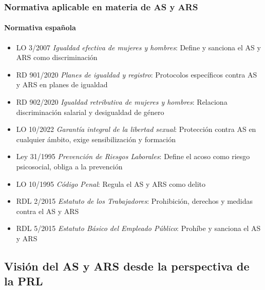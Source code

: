 \documentclass{beamer}
\newcommand{\highlight}[1]{{\color{Blue} #1}}
\begin{document}
    \begin{frame}
        \frametitle{Normativa aplicable en materia de AS y ARS}
        \framesubtitle{Normativa española}
        \begin{itemize}
            \item \highlight{LO 3/2007} \textit{Igualdad efectiva de mujeres y hombres}: Define y sanciona el AS y ARS como discriminación
            \item \highlight{RD 901/2020} \textit{Planes de igualdad y registro}: Protocolos específicos contra AS y ARS en planes de igualdad
            \item \highlight{RD 902/2020} \textit{Igualdad retributiva de mujeres y hombres}: Relaciona discriminación salarial y desigualdad de género
            \item \highlight{LO 10/2022} \textit{Garantía integral de la libertad sexual}: Protección contra AS en cualquier ámbito, exige sensibilización y formación
            \item \highlight{Ley 31/1995} \textit{Prevención de Riesgos Laborales}: Define el acoso como riesgo psicosocial, obliga a la prevención
            \item \highlight{LO 10/1995} \textit{Código Penal}: Regula el AS y ARS como delito
            \item \highlight{RDL 2/2015} \textit{Estatuto de los Trabajadores}: Prohibición, derechos y medidas contra el AS y ARS
            \item \highlight{RDL 5/2015} \textit{Estatuto Básico del Empleado Público}: Prohíbe y sanciona el AS y ARS
        \end{itemize}
    \end{frame}

    \subsection{Visión del AS y ARS desde la perspectiva de la PRL}
\end{document}
